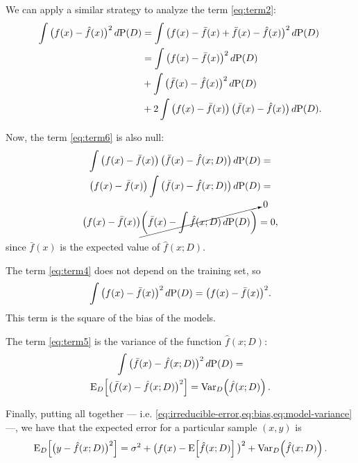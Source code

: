 We can apply a similar strategy to analyze the term \eqref{eq:term2}:
\begin{align}
  \notag \int \big( f(x) - \hat{f}(x) \big)^2\, d\!\operatorname{P}(D)
    &= \int \big( f(x) - \bar{f}(x) + \bar{f}(x) - \hat{f}(x) \big)^2\, d\!\operatorname{P}(D) \\
    &= \label{eq:term4}\int \big( f(x) - \bar{f}(x) \big)^2\, d\!\operatorname{P}(D) \\
    &+ \label{eq:term5}\int \big( \bar{f}(x) - \hat{f}(x) \big)^2\, d\!\operatorname{P}(D) \\
    &+ \label{eq:term6}2 \int \big( f(x) - \bar{f}(x) \big)\,\big( \bar{f}(x) - \hat{f}(x) \big)\, d\!\operatorname{P}(D)\text{.}
\end{align}

Now, the term \eqref{eq:term6} is also null:
\begin{multline*}
  \int \big( f(x) - \bar{f}(x) \big)\,\big( \bar{f}(x) - \hat{f}(x; D) \big)\, d\!\operatorname{P}(D) = \\
  \big( f(x) - \bar{f}(x) \big) \int \big( \bar{f}(x) - \hat{f}(x; D) \big)\, d\!\operatorname{P}(D) = \\
  \big( f(x) - \bar{f}(x) \big) \cancelto{0}{\left( \bar{f}(x) - \int \hat{f}(x; D)\, d\!\operatorname{P}(D) \right)} = 0\text{,}
\end{multline*}
since $\bar{f}(x)$ is the expected value of $\hat{f}(x; D)$.

The term \eqref{eq:term4} does not depend on the training set, so
\begin{equation}
  \label{eq:bias}
  \int \big( f(x) - \bar{f}(x) \big)^2\, d\!\operatorname{P}(D) =
  \big( f(x) - \bar{f}(x) \big)^2\text{.}
\end{equation}
This term is the square of the bias of the models.

The term \eqref{eq:term5} is the variance of the function $\hat{f}(x; D)$:
\begin{multline}
  \label{eq:model-variance}
  \int \big( \bar{f}(x) - \hat{f}(x; D) \big)^2\, d\!\operatorname{P}(D) =\\
  \operatorname{E}_D\!\left[ \big( \bar{f}(x) - \hat{f}(x; D) \big)^2 \right] =
  \operatorname{Var}_D\!\left( \hat{f}(x; D) \right)\text{.}
\end{multline}

Finally, putting all together --- i.e.  \cref{eq:irreducible-error,eq:bias,eq:model-variance}
---, we have that the expected error for a particular sample $(x, y)$ is
\[
  \operatorname{E}_D\!\left[ \big( y - \hat{f}(x; D) \big)^2 \right] =
    \sigma^2 +
    \big( f(x) - \operatorname{E}\!\left[ \hat{f}(x; D) \right] \big)^2 +
    \operatorname{Var}_D\!\left( \hat{f}(x; D) \right)\text{.}
\]

